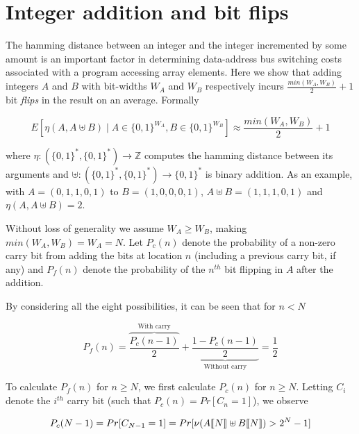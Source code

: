 \chapter{Integer addition and bit flips}

\label{AppendixC}


The hamming distance between an integer and the integer incremented by
some amount is an important factor in determining data-address bus
switching costs associated with a program accessing array elements.
Here we show that adding integers $A$ and $B$ with bit-widths $W_A$
and $W_B$ respectively incurs $\frac{min(W_A, W_B)}{2} + 1$ bit
\textit{flips} in the result on an average.  Formally

\begin{equation}
  \label{eq:master-flip}
  E[\eta(A, A \uplus B) \mid A \in \{0, 1\}^{W_A}, B \in \{0,
    1\}^{W_B} ] \approx \frac{min(W_A, W_B)}{2} + 1
\end{equation}

where $\eta : (\{0, 1\}^*, \{0, 1\}^*) \to \mathbb{Z}$ computes the
hamming distance between its arguments and $\uplus : (\{0, 1\}^*, \{0,
1\}^*) \to \{0, 1\}^*$ is binary addition.  As an example, with $A =
(0, 1, 1, 0, 1)$ to $B = (1, 0, 0, 0, 1)$, $A \uplus B = (1, 1, 1, 0,
1)$ and $\eta(A, A \uplus B) = 2$.

Without loss of generality we assume $W_A \geq W_B$, making $min(W_A,
W_B) = W_A = N$.  Let $P_c(n)$ denote the probability of a non-zero
carry bit from adding the bits at location $n$ (including a previous
carry bit, if any) and $P_f(n)$ denote the probability of the $n^{th}$
bit flipping in $A$ after the addition.

By considering all the eight possibilities, it can be seen that for $n
< N$

\begin{equation}
    P_f(n) = \overbrace{\frac{P_c(n - 1)}{2}}^{\text{With carry}} +
    \underbrace{\frac{1 - P_c(n - 1)}{2}}_{\text{Without carry}} = \frac{1}{2}
\end{equation}

To calculate $P_f(n)$ for $n \geq N$, we first calculate $P_c(n)$ for
$n \geq N$.  Letting $C_i$ denote the $i^{th}$ carry bit (such that
$P_c(n) = Pr[C_n = 1]$), we observe

\begin{equation}
  P_c(N - 1) = Pr[C_{N - 1} = 1] = Pr[\nu(A\llbracket N \rrbracket  \uplus
    B\llbracket N \rrbracket ) > 2^N - 1]
\end{equation}

